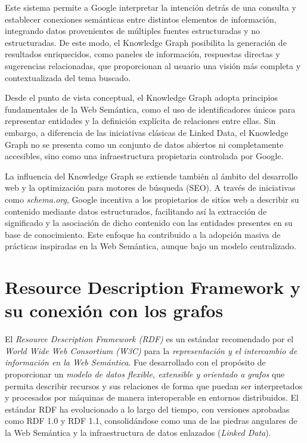\documentclass{article}
\begin{document}
Este sistema permite a Google interpretar la intención detrás de una consulta y establecer conexiones semánticas entre distintos elementos de información, integrando datos provenientes de múltiples fuentes estructuradas y no estructuradas. De este modo, el Knowledge Graph posibilita la generación de resultados enriquecidos, como paneles de información, respuestas directas y sugerencias relacionadas, que proporcionan al usuario una visión más completa y contextualizada del tema buscado.

Desde el punto de vista conceptual, el Knowledge Graph adopta principios fundamentales de la Web Semántica, como el uso de identificadores únicos para representar entidades y la definición explícita de relaciones entre ellas. Sin embargo, a diferencia de las iniciativas clásicas de Linked Data, el Knowledge Graph no se presenta como un conjunto de datos abiertos ni completamente accesibles, sino como una infraestructura propietaria controlada por Google.

La influencia del Knowledge Graph se extiende también al ámbito del desarrollo web y la optimización para motores de búsqueda (SEO). A través de iniciativas como \textit{schema.org}, Google incentiva a los propietarios de sitios web a describir su contenido mediante datos estructurados, facilitando así la extracción de significado y la asociación de dicho contenido con las entidades presentes en su base de conocimiento. Este enfoque ha contribuido a la adopción masiva de prácticas inspiradas en la Web Semántica, aunque bajo un modelo centralizado.


\section{Resource Description Framework y su conexión con los grafos}

El \textit{Resource Description Framework (RDF)} es un estándar recomendado por el \textit{World Wide Web Consortium (W3C)} para la \textit{representación y el intercambio de información en la Web Semántica}. Fue desarrollado con el propósito de proporcionar un \textit{modelo de datos flexible, extensible y orientado a grafos} que permita describir recursos y sus relaciones de forma que puedan ser interpretados y procesados por máquinas de manera interoperable en entornos distribuidos. El estándar RDF ha evolucionado a lo largo del tiempo, con versiones aprobadas como RDF 1.0 y RDF 1.1, consolidándose como una de las piedras angulares de la Web Semántica y la infraestructura de datos enlazados (\textit{Linked Data}).
\end{document}
